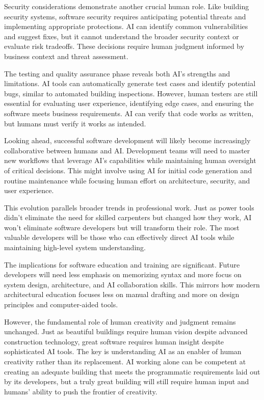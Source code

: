 \documentclass[
  Letterpaper,
]{scrbook}
\begin{document}
Security considerations demonstrate another crucial human role. Like
building security systems, software security requires anticipating
potential threats and implementing appropriate protections. AI can
identify common vulnerabilities and suggest fixes, but it cannot
understand the broader security context or evaluate risk tradeoffs.
These decisions require human judgment informed by business context and
threat assessment.

The testing and quality assurance phase reveals both AI's strengths and
limitations. AI tools can automatically generate test cases and identify
potential bugs, similar to automated building inspections. However,
human testers are still essential for evaluating user experience,
identifying edge cases, and ensuring the software meets business
requirements. AI can verify that code works as written, but humans must
verify it works as intended.

Looking ahead, successful software development will likely become
increasingly collaborative between humans and AI. Development teams will
need to master new workflows that leverage AI's capabilities while
maintaining human oversight of critical decisions. This might involve
using AI for initial code generation and routine maintenance while
focusing human effort on architecture, security, and user experience.

This evolution parallels broader trends in professional work. Just as
power tools didn't eliminate the need for skilled carpenters but changed
how they work, AI won't eliminate software developers but will transform
their role. The most valuable developers will be those who can
effectively direct AI tools while maintaining high-level system
understanding.

The implications for software education and training are significant.
Future developers will need less emphasis on memorizing syntax and more
focus on system design, architecture, and AI collaboration skills. This
mirrors how modern architectural education focuses less on manual
drafting and more on design principles and computer-aided tools.

However, the fundamental role of human creativity and judgment remains
unchanged. Just as beautiful buildings require human vision despite
advanced construction technology, great software requires human insight
despite sophisticated AI tools. The key is understanding AI as an
enabler of human creativity rather than its replacement. AI working
alone can be competent at creating an adequate building that meets the
programmatic requirements laid out by its developers, but a truly great
building will still require human input and humans' ability to push the
frontier of creativity.
\end{document}
